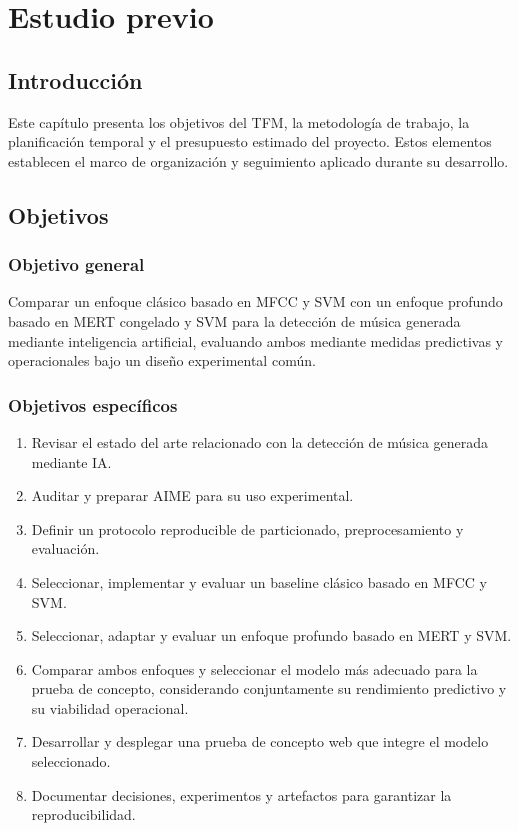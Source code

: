 \chapter{Estudio previo}
\label{cap:estudio-previo}

\section{Introducción}

Este capítulo presenta los objetivos del TFM, la metodología de trabajo, la planificación temporal y el presupuesto estimado del proyecto. Estos elementos establecen el marco de organización y seguimiento aplicado durante su desarrollo.

\section{Objetivos}

\subsection{Objetivo general}

Comparar un enfoque clásico basado en MFCC y SVM con un enfoque profundo basado en MERT congelado y SVM para la detección de música generada mediante inteligencia artificial, evaluando ambos mediante medidas predictivas y operacionales bajo un diseño experimental común.

\subsection{Objetivos específicos}

\begin{enumerate}
    \item Revisar el estado del arte relacionado con la detección de música generada mediante IA.
    \item Auditar y preparar AIME para su uso experimental.
    \item Definir un protocolo reproducible de particionado, preprocesamiento y evaluación.
    \item Seleccionar, implementar y evaluar un baseline clásico basado en MFCC y SVM.
    \item Seleccionar, adaptar y evaluar un enfoque profundo basado en MERT y SVM.
    \item Comparar ambos enfoques y seleccionar el modelo más adecuado para la prueba de concepto, considerando conjuntamente su rendimiento predictivo y su viabilidad operacional.
    \item Desarrollar y desplegar una prueba de concepto web que integre el modelo seleccionado.
    \item Documentar decisiones, experimentos y artefactos para garantizar la reproducibilidad.
\end{enumerate}

